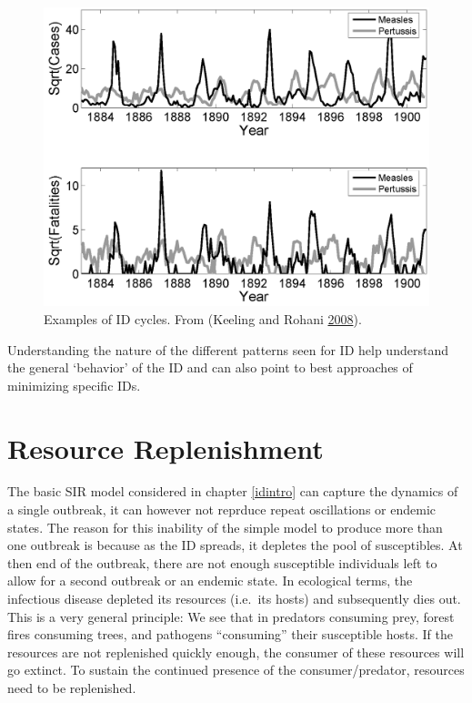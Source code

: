 \documentclass[]{book}
\theoremstyle{definition}
\theoremstyle{definition}
\theoremstyle{definition}
\theoremstyle{remark}
\begin{document}
\begin{figure}
\centering
\includegraphics{./images/IDcycles.png}
\caption{\label{fig:IDcycles}Examples of ID cycles. From (Keeling and Rohani
\protect\hyperlink{ref-keeling08}{2008}).}
\end{figure}

Understanding the nature of the different patterns seen for ID help
understand the general `behavior' of the ID and can also point to best
approaches of minimizing specific IDs.

\hypertarget{resource-replenishment}{%
\section{Resource Replenishment}\label{resource-replenishment}}

The basic SIR model considered in chapter \ref{idintro} can capture the
dynamics of a single outbreak, it can however not reprduce repeat
oscillations or endemic states. The reason for this inability of the
simple model to produce more than one outbreak is because as the ID
spreads, it depletes the pool of susceptibles. At then end of the
outbreak, there are not enough susceptible individuals left to allow for
a second outbreak or an endemic state. In ecological terms, the
infectious disease depleted its resources (i.e.~its hosts) and
subsequently dies out. This is a very general principle: We see that in
predators consuming prey, forest fires consuming trees, and pathogens
``consuming'' their susceptible hosts. If the resources are not
replenished quickly enough, the consumer of these resources will go
extinct. To sustain the continued presence of the consumer/predator,
resources need to be replenished.
\end{document}
